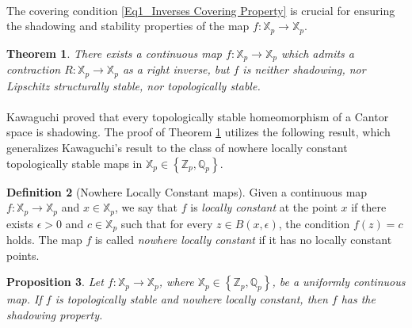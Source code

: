 \documentclass[a4paper, 12pt]{article}
\newtheorem{theorem}{Theorem}[section]
\newtheorem{proposition}[theorem]{Proposition}
\theoremstyle{definition}
\newtheorem{definition}[theorem]{Definition}
\begin{document}
	
	
	
	
	
	
	\paragraph{}
	
	The covering condition \eqref{Eq1_Inverses Covering Property} is crucial for ensuring the shadowing and stability properties of the map $f: \mathbb{X}_{p} \to \mathbb{X}_{p}$. 
	
	
	
	\begin{theorem}\label{Theor1_Single Right Inverse does not suffice for shadowing} 
		There exists a continuous map $f: \mathbb{X}_{p} \to \mathbb{X}_{p} $ which admits a contraction $R: \mathbb{X}_{p} \to \mathbb{X}_{p}$ as a right inverse, but $f$ is neither shadowing, nor Lipschitz structurally stable, nor topologically stable.  
	\end{theorem}
	
	
	
	\paragraph{}
	
	Kawaguchi \cite{Kawaguchi_Topological_Stability_and_Shadowing_of_Zero-dimensional_Dynamical_Systems} proved that every topologically stable homeomorphism of a Cantor space is shadowing. 
	The proof of Theorem \ref{Theor1_Single Right Inverse does not suffice for shadowing} utilizes the following result, which generalizes Kawaguchi's result to the class of nowhere locally constant topologically stable maps in $\mathbb{X}_{p} \in  \left\{  \mathbb{Z}_{p}, \mathbb{Q}_{p}  \right\} $. 
	
	\begin{definition}[Nowhere Locally Constant maps]\label{Def_Nowhere Locally Stable}
		Given a continuous map $f :\mathbb{X}_{p} \to \mathbb{X}_{p}$ and $x \in \mathbb{X}_{p}$, we say that $f$ is \textit{locally constant} at the point $x$ if there exists $  \epsilon  > 0$ and $c \in \mathbb{X}_{p}$ such that for every $z \in B(x,  \epsilon )$, the condition $f(z) = c$ holds. The map $f $ is called \textit{nowhere locally constant} if it has no locally constant points.    
	\end{definition}
	
	\begin{proposition}\label{Prop1_Topological Stability implies Shadowing}
		Let $f : \mathbb{X}_{p} \to \mathbb{X}_{p}$, where $\mathbb{X}_{p} \in  \left\{   \mathbb{Z}_{p}, \mathbb{Q}_{p}  \right\} $, be a uniformly continuous map. If $f$ is topologically stable and nowhere locally constant, then $f$ has the shadowing property.     
	\end{proposition}
	
\end{document}
